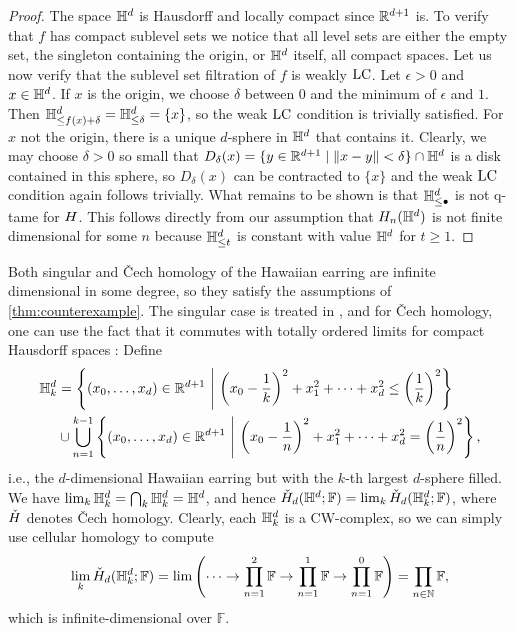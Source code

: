 \begin{proof}
	The space $\mathbb{H}^d$ is Hausdorff and locally compact since $\mathbb{R}^{d+1}$ is.
	To verify that $f$ has compact sublevel sets we notice that all level sets are either the empty set, the singleton containing the origin, or $\mathbb{H}^d$ itself, all compact spaces.
	Let us now verify that the sublevel set filtration of $f$ is weakly $\mathrm{LC}$.
	Let $\epsilon > 0$ and $x \in \mathbb{H}^d$.
	If $x$ is the origin, we choose $\delta$ between $0$ and the minimum of $\epsilon$ and $1$.
	Then $\mathbb{H}^d_{\leq f(x) + \delta} = \mathbb{H}^d_{\leq \delta} = \{x\}$, so the weak $\mathrm{LC}$ condition is trivially satisfied.
	For $x$ not the origin, there is a unique $d$-sphere in $\mathbb{H}^d$ that contains it.
	Clearly, we may choose $\delta > 0$ so small that $D_\delta(x) = \{y \in \mathbb{R}^{d+1} \mid \Vert x - y \Vert < \delta\} \cap \mathbb{H}^d$ is a disk contained in this sphere, so $D_\delta(x)$ can be contracted to $\{x\}$ and the weak $\mathrm{LC}$ condition again follows trivially.
	What remains to be shown is that $\mathbb{H}^d_{\leq \bullet}$ is not q-tame for $H$.
This follows directly from our assumption that $H_{n}(\mathbb{H}^d)$ is not finite dimensional for some $n$ because $\mathbb{H}^d_{\leq t}$ is constant with value $\mathbb{H}^d$ for $t \geq 1$.
\end{proof}

Both singular and \v{C}ech homology of the Hawaiian earring are infinite dimensional in some degree, so they satisfy the assumptions of \cref{thm:counterexample}.
The singular case is treated in \cite{Barratt.1962}, and for \v{C}ech homology, one can use the fact that it commutes with totally ordered limits for compact Hausdorff spaces \cite[Theorems VIII.3.6.\@ and X.3.1.]{MR0050886}:
Define 
\begin{align*}
\HE_k &= \left\{ (x_0, \dots, x_d) \in \R^{d+1} \ \middle|\  \left( x_0 - \frac{1}{k} \right)^2 + x_1^2 + \dots + x_d^2 \leq \left( \frac{1}{k} \right)^2 \right\} \\
& \cup \bigcup_{n=1}^{k-1} \left\{ (x_0, \dots, x_d) \in \R^{d+1} \ \middle|\  \left( x_0 - \frac{1}{n} \right)^2 + x_1^2 + \dots + x_d^2 = \left( \frac{1}{n} \right)^2 \right \},
\end{align*}
i.e., the $d$-dimensional Hawaiian earring but with the $k$-th largest $d$-sphere filled.
We have $\lim_{k} \mathbb{H}^d_{k} = \bigcap_{k} \mathbb{H}^d_{k} = \mathbb{H}^d$, and hence $\check{H}_{d}(\mathbb{H}^d; \mathbb{F}) = \lim_{k} \check{H}_{d}(\mathbb{H}^d_{k}; \mathbb{F})$, where $\check{H}$ denotes \v{C}ech homology.
Clearly, each $\mathbb{H}^d_{k}$ is a CW-complex, so we can simply use cellular homology to compute
\begin{equation*}
\lim_{k}\check{H}_{d}(\mathbb{H}^{d}_{k}; \mathbb{F})=\lim\left(\dots\to \prod_{n=1}^2\mathbb{F}\to \prod_{n=1}^1\mathbb{F}\to \prod_{n=1}^0\mathbb{F}\right)=\prod_{n\in\mathbb{N}}\mathbb{F},
\end{equation*}
which is infinite-dimensional over $\mathbb{F}$.


